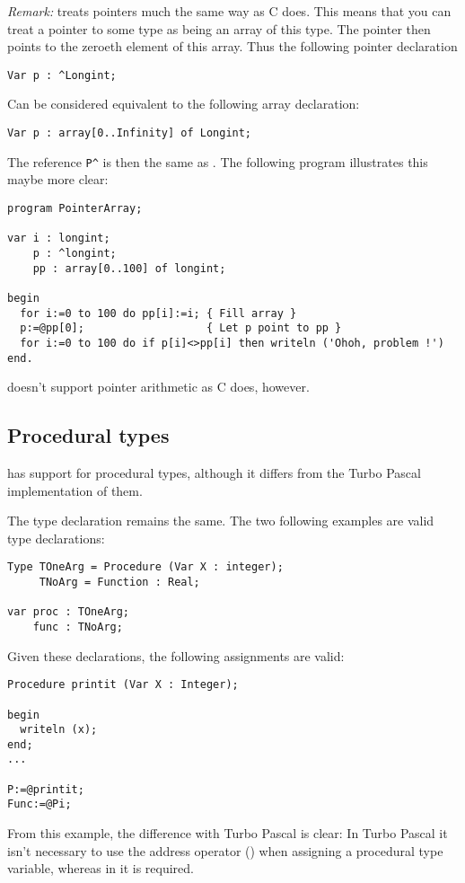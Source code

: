 \documentclass{report}
\begin{document}
{\em Remark:} \fpk treats pointers much the same way as C does. This means
that you can treat a pointer to some type as being an array of this type.  
The pointer then points to the zeroeth element of this array. Thus the
following pointer declaration 
\begin{verbatim}
Var p : ^Longint;
\end{verbatim}
Can be considered equivalent to the following array declaration:
\begin{verbatim}
Var p : array[0..Infinity] of Longint;
\end{verbatim}
The reference \verb+P^+ is then the same as . The following program
illustrates this maybe more clear:
\begin{CodEx}
\begin{verbatim}
program PointerArray;

var i : longint;
    p : ^longint;
    pp : array[0..100] of longint;  

begin
  for i:=0 to 100 do pp[i]:=i; { Fill array }
  p:=@pp[0];                   { Let p point to pp }
  for i:=0 to 100 do if p[i]<>pp[i] then writeln ('Ohoh, problem !')
end.
\end{verbatim}
\end{CodEx}
\fpk doesn't support pointer arithmetic as C does, however.

\subsection{Procedural types}
\fpk has support for procedural types, although it differs from the Turbo
Pascal implementation of them.

The type declaration remains the same. The two following examples are valid
type declarations:
\begin{verbatim}
Type TOneArg = Procedure (Var X : integer);
     TNoArg = Function : Real;

var proc : TOneArg;
    func : TNoArg;
\end{verbatim}
Given these declarations, the following assignments are valid:
\begin{verbatim}
Procedure printit (Var X : Integer);

begin
  writeln (x);
end;
...

P:=@printit;
Func:=@Pi;
\end{verbatim}
From this example, the difference with Turbo Pascal is clear: In Turbo
Pascal it isn't necessary to use the address operator () 
when assigning a procedural type variable, whereas in \fpk it is required.
\end{document}
